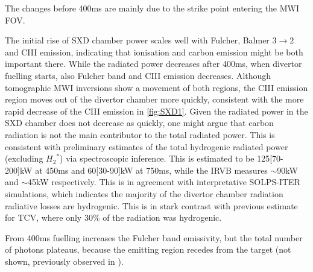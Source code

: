 The changes before 400ms are mainly due to the strike point entering the MWI FOV.

The initial rise of SXD chamber power scales well with Fulcher, Balmer $3 \rightarrow 2$ and CIII emission, indicating that ionisation and carbon emission might be both important there. While the radiated power decreases after 400ms, when divertor fuelling starts, also Fulcher band and CIII emission decreases. Although tomographic MWI inversions show \cite{Wijkamp2022} a movement of both regions, the CIII emission region moves out of the divertor chamber more quickly, consistent with the more rapid decrease of the CIII emission in \autoref{fig:SXD1}. Given the radiated power in the SXD chamber does not decrease as quickly, one might argue that carbon radiation is not the main contributor to the total radiated power. This is consistent with preliminary estimates of the total hydrogenic radiated power (excluding ${H_2}^*$) via spectroscopic inference. This is estimated to be 125[70-200]kW at 450ms and 60[30-90]kW at 750ms, while the IRVB measures $\sim$90kW and $\sim$45kW respectively.\cite{Verhaegh2022} This is in agreement with interpretative SOLPS-ITER simulations, which indicates the majority of the divertor chamber radiation radiative losses are hydrogenic. This is in stark contrast with previous estimate for TCV, where only 30\% of the radiation was hydrogenic.\cite{Verhaegh2019,Verhaegh2021}


From 400ms fuelling increases the Fulcher band emissivity, but the total number of photons plateaus, because the emitting region recedes from the target (not shown, previously observed in \cite{Verhaegh2022}).



